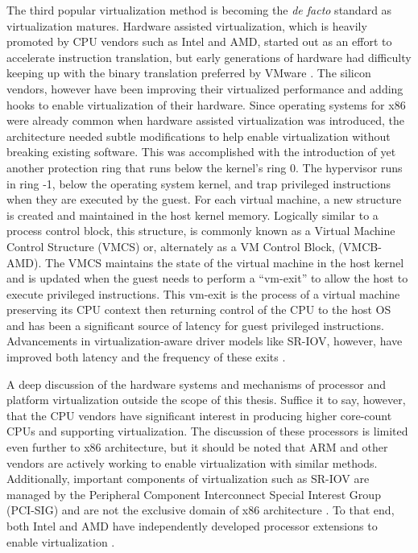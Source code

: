 The third popular virtualization method is becoming the \emph{de facto} standard as virtualization matures.
Hardware assisted virtualization, which is heavily promoted by CPU vendors such as Intel and AMD, started out as an effort to accelerate instruction translation, but early generations of hardware had difficulty keeping up with the binary translation preferred by VMware \autocite{vmwareVT}.
The silicon vendors, however have been improving their virtualized performance and adding hooks to enable virtualization of their hardware.
Since operating systems for x86 were already common when hardware assisted virtualization was introduced, the architecture needed subtle modifications to help enable virtualization without breaking existing software.  
This was accomplished with the introduction of yet another protection ring that runs below the kernel's ring 0.  
The hypervisor runs in ring -1, below the operating system kernel, and trap privileged instructions when they are executed by the guest.
For each virtual machine, a new structure is created and maintained in the host kernel memory.  
Logically similar to a process control block, this structure, is commonly known as a Virtual Machine Control Structure (VMCS) or, alternately as a VM Control Block, (VMCB-AMD). 
The VMCS maintains the state of the virtual machine in the host kernel and is updated when the guest needs to perform a ``vm-exit'' to allow the host to execute privileged instructions.
This vm-exit is the process of a virtual machine preserving its CPU context then returning control of the CPU to the host OS and has been a significant source of latency for guest privileged instructions.
Advancements in virtualization-aware driver models like SR-IOV, however, have improved both latency and the frequency of these exits \autocite{_nasa_1}.

A deep discussion of the hardware systems and mechanisms of processor and platform virtualization outside the scope of this thesis.
Suffice it to say, however, that the CPU vendors have significant interest in producing higher core-count CPUs and supporting virtualization.
The discussion of these processors is limited even further to x86 architecture, but it should be noted that ARM and other vendors are actively working to enable virtualization with similar methods.
Additionally, important components of virtualization such as SR-IOV are managed by the Peripheral Component Interconnect Special Interest Group (PCI-SIG) and are not the exclusive domain of x86 architecture \autocite{_pcisig_1}.
To that end, both Intel and AMD have independently developed processor extensions to enable virtualization \autocite{_grinberg_1}.


